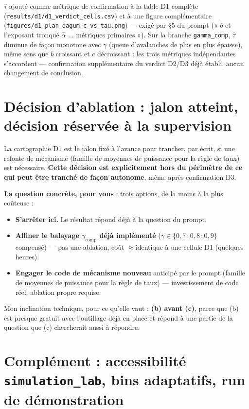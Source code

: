 \documentclass[11pt,a4paper]{article}
\newcommand{\code}[1]{\texttt{#1}}
\begin{document}
$\hat\tau$ ajouté comme métrique de confirmation à la table D1 complète
(\code{results/d1/d1\_verdict\_cells.csv}) et à une figure complémentaire
(\code{figures/d1\_plan\_dagum\_c\_vs\_tau.png}) --- exigé par \S5 du
prompt (« $b$ et l'exposant tronqué $\hat\alpha$ ... métriques
primaires »). Sur la branche \code{gamma\_comp}, $\hat\tau$ diminue de
façon monotone avec $\gamma$ (queue d'avalanches de plus en plus épaisse),
même sens que $b$ croissant et $c$ décroissant : les trois métriques
indépendantes s'accordent --- confirmation supplémentaire du verdict
D2/D3 déjà établi, aucun changement de conclusion.

\section{Décision d'ablation : jalon atteint, décision réservée à la supervision}
\label{sec:ablation}

La cartographie D1 est le jalon fixé à l'avance pour trancher, par écrit,
si une refonte de mécanisme (famille de moyennes de puissance pour la
règle de taux) est nécessaire. \textbf{Cette décision est explicitement
hors du périmètre de ce qui peut être tranché de façon autonome}, même
après confirmation D3.

\textbf{La question concrète, pour vous} : trois options, de la moins à
la plus coûteuse :
\begin{itemize}
\item[(a)] \textbf{S'arrêter ici.} Le résultat répond déjà à la question
  du prompt.
\item[(b)] \textbf{Affiner le balayage $\gamma_{\mathrm{comp}}$ déjà
  implémenté} ($\gamma\in\{0{,}7\,;0{,}8\,;0{,}9\}$ compensé) --- pas une
  ablation, coût $\approx$identique à une cellule D1 (quelques heures).
\item[(c)] \textbf{Engager le code de mécanisme nouveau} anticipé par le
  prompt (famille de moyennes de puissance pour la règle de taux) ---
  investissement de code réel, ablation propre requise.
\end{itemize}

Mon inclination technique, pour ce qu'elle vaut : \textbf{(b) avant (c)},
parce que (b) est presque gratuit avec l'outillage déjà en place et
répond à une partie de la question que (c) chercherait aussi à répondre.

\section{Complément : accessibilité \code{simulation\_lab}, bins adaptatifs, run de démonstration}
\label{sec:complement}
\end{document}
